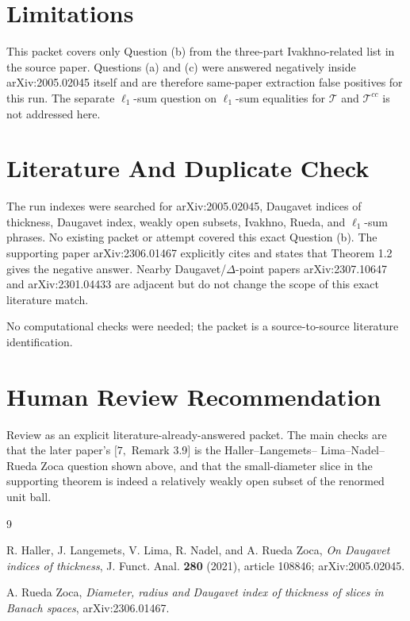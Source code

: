 \documentclass[11pt]{article}
\newcommand{\T}{\mathcal T}
\begin{document}
\section*{Limitations}

This packet covers only Question (b) from the three-part Ivakhno-related list
in the source paper.  Questions (a) and (c) were answered negatively inside
arXiv:2005.02045 itself and are therefore same-paper extraction false
positives for this run.  The separate \(\ell_1\)-sum question on
\(\ell_1\)-sum equalities for \(\T\) and \(\T^{cc}\) is not addressed here.

\section*{Literature And Duplicate Check}

The run indexes were searched for arXiv:2005.02045, Daugavet indices of
thickness, Daugavet index, weakly open subsets, Ivakhno, Rueda, and
\(\ell_1\)-sum phrases.  No existing packet or attempt covered this exact
Question (b).  The supporting paper arXiv:2306.01467 explicitly cites
\cite[Remark 3.9]{HLLNR} and states that Theorem 1.2 gives the negative
answer.  Nearby Daugavet/\(\Delta\)-point papers arXiv:2307.10647 and
arXiv:2301.04433 are adjacent but do not change the scope of this exact
literature match.

No computational checks were needed; the packet is a source-to-source
literature identification.

\section*{Human Review Recommendation}

Review as an explicit literature-already-answered packet.  The main checks
are that the later paper's \([7,\) Remark 3.9\(]\) is the Haller--Langemets--
Lima--Nadel--Rueda Zoca question shown above, and that the small-diameter
slice in the supporting theorem is indeed a relatively weakly open subset of
the renormed unit ball.

\begin{thebibliography}{9}

R. Haller, J. Langemets, V. Lima, R. Nadel, and A. Rueda Zoca,
\emph{On Daugavet indices of thickness},
J. Funct. Anal. \textbf{280} (2021), article 108846; arXiv:2005.02045.

A. Rueda Zoca,
\emph{Diameter, radius and Daugavet index of thickness of slices in Banach spaces},
arXiv:2306.01467.

\end{thebibliography}
\end{document}
